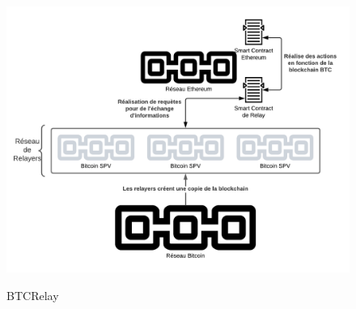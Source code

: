 \begin{figure}[h!]
  \centering
  \includegraphics[scale=0.5]{decentralisation/btcRelay2.png}
  \label{fig:btcRelay2}
  \caption{BTCRelay}
\end{figure}

\pagebreak
